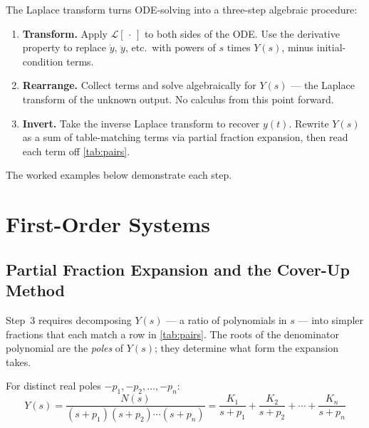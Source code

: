 \documentclass[../../book.tex]{subfiles}
\begin{document}
The Laplace transform turns ODE-solving into a three-step algebraic procedure:

\begin{enumerate}
  \item \textbf{Transform.}  Apply $\mathcal{L}[\,\cdot\,]$ to both sides of
    the ODE.  Use the derivative property to replace $\dot{y}$, $\ddot{y}$,
    etc.\ with powers of $s$ times $Y(s)$, minus initial-condition terms.

  \item \textbf{Rearrange.}  Collect terms and solve algebraically for $Y(s)$
    --- the Laplace transform of the unknown output.  No calculus from this
    point forward.

  \item \textbf{Invert.}  Take the inverse Laplace transform to recover $y(t)$.
    Rewrite $Y(s)$ as a sum of table-matching terms via partial fraction
    expansion, then read each term off \cref{tab:pairs}.
\end{enumerate}

The worked examples below demonstrate each step.

\section{First-Order Systems}
\label{sec:first_order}

\subsection{Partial Fraction Expansion and the Cover-Up Method}
\label{sec:pfe}

Step~3 requires decomposing $Y(s)$ --- a ratio of polynomials in $s$ --- into
simpler fractions that each match a row in \cref{tab:pairs}.  The roots of the
denominator polynomial are the \emph{poles} of $Y(s)$; they determine what
form the expansion takes.

For distinct real poles $-p_1, -p_2, \ldots, -p_n$:
\begin{equation}
  Y(s) = \frac{N(s)}{(s+p_1)(s+p_2)\cdots(s+p_n)}
        = \frac{K_1}{s+p_1} + \frac{K_2}{s+p_2} + \cdots + \frac{K_n}{s+p_n}
  \label{eq:pfe}
\end{equation}
\end{document}
